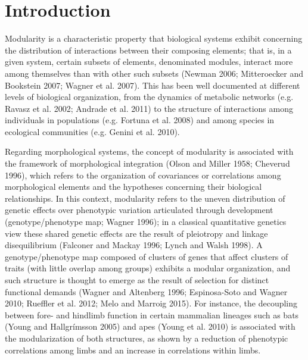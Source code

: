 \documentclass[12pt,]{article}
\begin{document}
\section{Introduction}\label{introduction}

Modularity is a characteristic property that biological systems exhibit
concerning the distribution of interactions between their composing
elements; that is, in a given system, certain subsets of elements,
denominated modules, interact more among themselves than with other such
subsets (Newman 2006; Mitteroecker and Bookstein 2007; Wagner et al.
2007). This has been well documented at different levels of biological
organization, from the dynamics of metabolic networks (e.g. Ravasz et
al. 2002; Andrade et al. 2011) to the structure of interactions among
individuals in populations (e.g. Fortuna et al. 2008) and among species
in ecological communities (e.g. Genini et al. 2010).

Regarding morphological systems, the concept of modularity is associated
with the framework of morphological integration (Olson and Miller 1958;
Cheverud 1996), which refers to the organization of covariances or
correlations among morphological elements and the hypotheses concerning
their biological relationships. In this context, modularity refers to
the uneven distribution of genetic effects over phenotypic variation
articulated through development (genotype/phenotype map; Wagner 1996);
in a classical quantitative genetics view these shared genetic effects
are the result of pleiotropy and linkage disequilibrium (Falconer and
Mackay 1996; Lynch and Walsh 1998). A genotype/phenotype map composed of
clusters of genes that affect clusters of traits (with little overlap
among groups) exhibits a modular organization, and such structure is
thought to emerge as the result of selection for distinct functional
demands (Wagner and Altenberg 1996; Espinosa-Soto and Wagner 2010;
Rueffler et al. 2012; Melo and Marroig 2015). For instance, the
decoupling between fore- and hindlimb function in certain mammalian
lineages such as bats (Young and Hallgrímsson 2005) and apes (Young et
al. 2010) is associated with the modularization of both structures, as
shown by a reduction of phenotypic correlations among limbs and an
increase in correlations within limbs.
\end{document}
